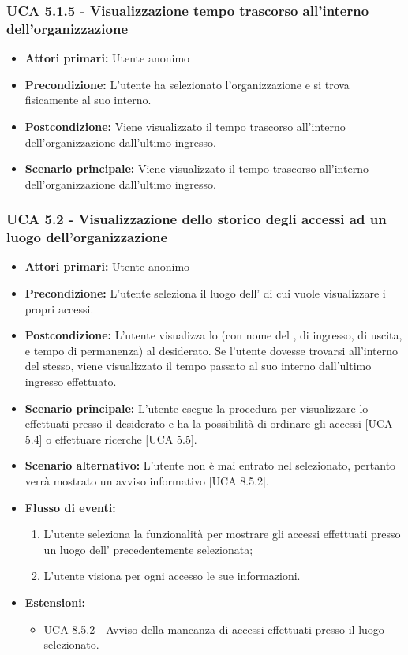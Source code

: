 \subsubsection{UCA 5.1.5 - Visualizzazione tempo trascorso all'interno dell'organizzazione}
\begin{itemize}
	\item \textbf{Attori primari:} Utente anonimo
	\item \textbf{Precondizione:} L'utente ha selezionato l'organizzazione e si trova fisicamente al suo interno.
	\item \textbf{Postcondizione:} Viene visualizzato il tempo trascorso all'interno dell'organizzazione dall'ultimo ingresso.
	\item \textbf{Scenario principale:} Viene visualizzato il tempo trascorso all'interno dell'organizzazione dall'ultimo ingresso.
\end{itemize}

\subsubsection{UCA 5.2 - Visualizzazione dello storico degli accessi ad un luogo dell'organizzazione}
\begin{itemize}
    \item \textbf{Attori primari:} Utente anonimo
    \item \textbf{Precondizione:} L'utente seleziona il luogo dell' di cui vuole visualizzare i propri accessi.
    \item \textbf{Postcondizione:} L'utente visualizza lo  (con nome del ,  di ingresso, di uscita, e tempo di permanenza) al  desiderato. Se l'utente dovesse trovarsi all'interno del  stesso, viene visualizzato il tempo passato al suo interno dall'ultimo ingresso effettuato.
    \item \textbf{Scenario principale:} L'utente esegue la procedura per visualizzare lo  effettuati presso il  desiderato e ha la possibilità di ordinare gli accessi [UCA 5.4] o effettuare ricerche [UCA 5.5].
    \item \textbf{Scenario alternativo:} L'utente non è mai entrato nel  selezionato, pertanto verrà mostrato un avviso informativo [UCA 8.5.2].
    \item \textbf{Flusso di eventi:}
    \begin{enumerate}
        \item L'utente seleziona la funzionalità per mostrare gli accessi effettuati presso un luogo dell' precedentemente selezionata;
        \item L'utente visiona per ogni accesso le sue informazioni.
    \end{enumerate}
    \item \textbf{Estensioni:}
    \begin{itemize}
        \item UCA 8.5.2 - Avviso della mancanza di accessi effettuati presso il luogo selezionato.
    \end{itemize}
\end{itemize}

